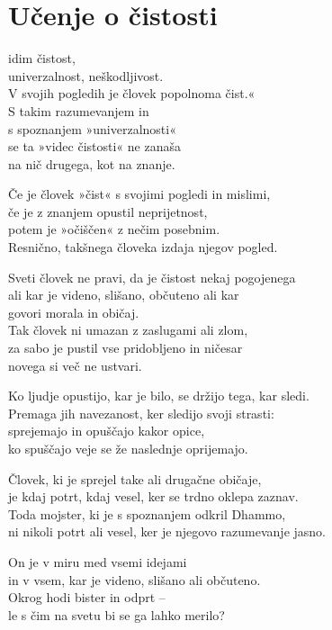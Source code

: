 \cleartorecto
{}
\chapter{Učenje o čistosti}

idim čistost,\\ univerzalnost, neškodljivost.\\
V svojih pogledih je človek popolnoma čist.«\\
S takim razumevanjem in\\\vin s spoznanjem »univerzalnosti«\\
se ta »videc čistosti« ne zanaša\\\vin na nič drugega, kot na znanje.

Če je človek »čist« s svojimi pogledi in mislimi,\\
če je z znanjem opustil neprijetnost,\\
potem je »očiščen« z nečim posebnim.\\
Resnično, takšnega človeka izdaja njegov pogled.

Sveti človek ne pravi, da je čistost nekaj pogojenega\\
ali kar je videno, slišano, občuteno ali kar\\\vin govori morala in običaj.\\
Tak človek ni umazan z zaslugami ali zlom,\\
za sabo je pustil vse pridobljeno in ničesar\\\vin novega si več ne ustvari.

\clearpage

Ko ljudje opustijo, kar je bilo, se držijo tega, kar sledi.\\
Premaga jih navezanost, ker sledijo svoji strasti:\\
sprejemajo in opuščajo kakor opice,\\
ko spuščajo veje se že naslednje oprijemajo.

Človek, ki je sprejel take ali drugačne običaje,\\
je kdaj potrt, kdaj vesel, ker se trdno oklepa zaznav.\\
Toda mojster, ki je s spoznanjem odkril Dhammo,\\
ni nikoli potrt ali vesel, ker je njegovo razumevanje jasno.

On je v miru med vsemi idejami\\
in v vsem, kar je videno, slišano ali občuteno.\\
Okrog hodi bister in odprt --\\
le s čim na svetu bi se ga lahko merilo?

